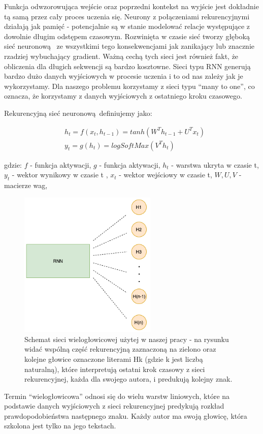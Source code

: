 Funkcja odwzorowująca wejście oraz poprzedni kontekst na wyjście jest dokładnie tą samą przez cały proces
uczenia się. Neurony z połączeniami rekurencyjnymi działają jak pamięć - potencjalnie są w stanie modelować relacje
występujące z dowolnie długim odstępem czasowym. 
Rozwinięta w czasie sieć tworzy głęboką sieć neuronową 
ze wszystkimi tego konsekwencjami jak zanikający lub znacznie rzadziej wybuchający gradient. 
Ważną cechą tych sieci jest również fakt, że obliczenia dla długich sekwencji są bardzo kosztowne.
Sieci typu RNN generują bardzo dużo danych wyjściowych w procesie uczenia i to od nas zależy jak je 
wykorzystamy. Dla naszego problemu korzystamy z sieci typu ``many to one'', co oznacza, że korzystamy
z danych wyjściowych z ostatniego kroku czasowego.

\newpage
Rekurencyjną sieć neuronową definiujemy jako:

\begin{align}
  &h_t = f(x_t, h_{t-1}) = tanh(W^Th_{t-1} + U^Tx_t) \\ 
  &y_t = g(h_t) = logSoftMax(V^Th_t)
\end{align}

gdzie: \newline
$f$ - funkcja aktywacji, \newline
$g$ - funkcja aktywacji, \newline
$h_t$ - warstwa ukryta w czasie t, \newline
$y_t$ - wektor wynikowy w czasie t , \newline
$x_t$ - wektor wejściowy w czasie t, \newline
$W, U, V$ - macierze wag, \newline


\begin{figure}[H]
\centering
\includegraphics[height=7cm]{./images/multiheaded-rnn.png}
\caption{Schemat sieci wielogłowicowej użytej w naszej pracy - na rysunku widać wspólną część rekurencyjną zaznaczoną na zielono
oraz kolejne głowice oznaczone literami Hk (gdzie k jest liczbą naturalną), które interpretują ostatni krok czasowy z sieci rekurencyjnej, każda
dla swojego autora, i predukują kolejny znak.}
\label{fig:test5}
\end{figure}


Termin ``wielogłowicowa'' odnosi się do wielu warstw liniowych, które na podstawie danych wyjściowych z 
sieci rekurencyjnej predykują rozkład prawdopodobieństwa następnego znaku. Każdy autor ma swoją głowicę, która 
szkolona jest tylko na jego tekstach.